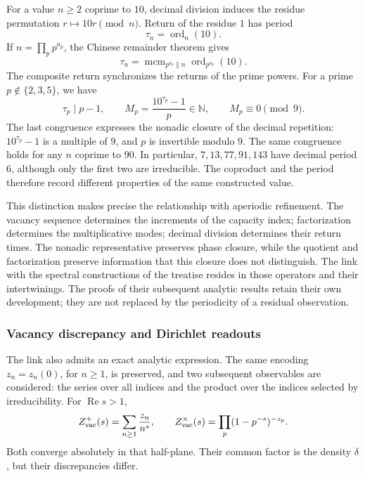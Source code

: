 For a value \(n\geq2\) coprime to \(10\), decimal division induces the
residue permutation \(r\mapsto10r\pmod n\). Return of the residue
\(1\) has period
\[
 \tau_n=\operatorname{ord}_n(10).
\]
If \(n=\prod_p p^{a_p}\), the Chinese remainder theorem gives
\[
 \tau_n=\operatorname{mcm}_{p^{a_p}\parallel n}
                    \operatorname{ord}_{p^{a_p}}(10).
\]
The composite return synchronizes the returns of the prime powers.
For a prime \(p\notin\{2,3,5\}\), we have
\[
 \tau_p\mid p-1,\qquad
 M_p=\frac{10^{\tau_p}-1}{p}\in\mathbb N,
 \qquad M_p\equiv0\pmod9.
\]
The last congruence expresses the nonadic closure of the decimal repetition:
\(10^{\tau_p}-1\) is a multiple of \(9\), and \(p\) is invertible modulo
\(9\). The same congruence holds for any \(n\) coprime to
\(90\). In particular, \(7,13,77,91,143\) have decimal period \(6\),
although only the first two are irreducible. The coproduct and the period
therefore record different properties of the same constructed value.

This distinction makes precise the relationship with aperiodic refinement.
The vacancy sequence determines the increments of the capacity
index; factorization determines the multiplicative modes;
decimal division determines their return times. The nonadic
representative preserves phase closure, while the quotient and
factorization preserve information that this closure does not distinguish. The
link with the spectral constructions of the treatise resides in those
operators and their intertwinings. The proofs of their subsequent
analytic results retain their own development; they are not replaced by
the periodicity of a residual observation.

\subsubsection{Vacancy discrepancy and Dirichlet readouts}

The link also admits an exact analytic expression. The same
encoding \(z_n=z_n(0)\), for \(n\geq1\), is preserved, and
two subsequent observables are considered: the series over all indices and the
product over the indices selected by irreducibility. For
\(\operatorname{Re}s>1\),
\[
 Z_{\rm vac}^{+}(s)=\sum_{n\geq1}\frac{z_n}{n^s},\qquad
 Z_{\rm vac}^{\times}(s)=\prod_p(1-p^{-s})^{-z_p}.
\]
Both converge absolutely in that half-plane. Their common factor is the
density \(\delta\), but their discrepancies differ.

